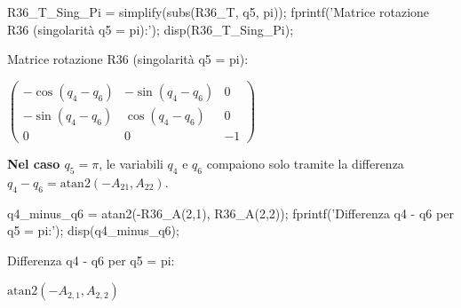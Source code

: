 \documentclass[11pt, a4paper]{article}
\begin{document}
\begin{matlabcode}
R36_T_Sing_Pi = simplify(subs(R36_T, q5, pi));
fprintf('Matrice rotazione R36 (singolarità q5 = pi):');
disp(R36_T_Sing_Pi);
\end{matlabcode}
\begin{matlaboutput}
Matrice rotazione R36 (singolarità q5 = pi):
\end{matlaboutput}
\begin{matlabsymbolicoutput}
$\displaystyle \left(\begin{array}{ccc}
-\cos \left(q_4 -q_6 \right) & -\sin \left(q_4 -q_6 \right) & 0\\
-\sin \left(q_4 -q_6 \right) & \cos \left(q_4 -q_6 \right) & 0\\
0 & 0 & -1
\end{array}\right)$
\end{matlabsymbolicoutput}
\begin{par}
\begin{flushleft}
\textbf{Nel caso $q_5 =\pi$}, le variabili $q_4$ e $q_6$ compaiono solo tramite la differenza $q_4 -q_6 =\textrm{atan2}(-A_{21} ,A_{22} )$.
\end{flushleft}
\end{par}
\begin{matlabcode}
q4_minus_q6 = atan2(-R36_A(2,1), R36_A(2,2));
fprintf('Differenza q4 - q6 per q5 = pi:\n');
disp(q4_minus_q6);
\end{matlabcode}
\begin{matlaboutput}
Differenza q4 - q6 per q5 = pi:
\end{matlaboutput}
\begin{matlabsymbolicoutput}
$\displaystyle \textrm{atan2}\left(-A_{2,1} ,A_{2,2} \right)$
\end{matlabsymbolicoutput}

\newpage
{}
\end{document}
